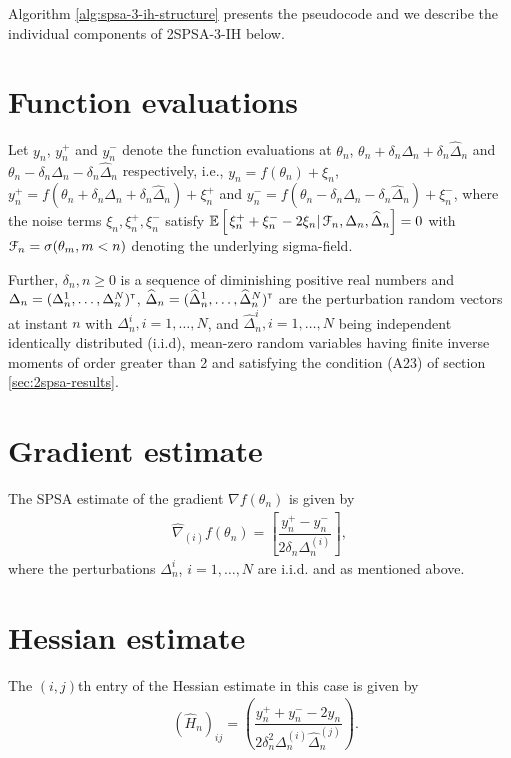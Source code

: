 Algorithm \ref{alg:spsa-3-ih-structure} presents the pseudocode and we describe the individual components of 2SPSA-3-IH below.
\section{Function evaluations}
Let $y_n$, $y_n^+$ and $y_n^-$ denote the function evaluations at $\theta_n$, $\theta_n+\delta_n \Delta_n+\delta_n \widehat \Delta_n$ and $\theta_n -\delta_n\Delta_n-\delta_n\widehat\Delta_n$ respectively, i.e., 
$y_n = f(\theta_n) + \xi_n$, $y_n^+ = f(\theta_n+\delta_n \Delta_n +\delta_n \widehat\Delta_n) + \xi_n^+$ and 
$y_n^- = f(\theta_n -\delta_n\Delta_n-\delta_n\widehat\Delta_n) + \xi_n^-$,
where the noise terms $\xi_n, \xi_n^+, \xi_n^-$ satisfy $\mathbb{E}\left[\left.\xi_n^+ + \xi_n^- - 2\xi_n \right| \mathcal{F}_n, \Delta_n, \widehat \Delta_n\right] = 0$ with $\mathcal{F}_n = \sigma(\theta_m,m <  n)$ denoting the underlying sigma-field.

Further, $\delta_n, n\geq 0$ is a sequence of diminishing positive real numbers and 
$\Delta_n = (\Delta_n^1,\ldots,\Delta_n^N)^\mathsf{\scriptscriptstyle T}$, $\widehat\Delta_n = (\widehat\Delta_n^1,\ldots,\widehat\Delta_n^N)^\mathsf{\scriptscriptstyle T}$ are the perturbation random vectors at instant $n$ with $\Delta_n^i,i=1,\ldots,N$, and $\widehat\Delta_n^i,i=1,\ldots,N$ being independent identically distributed (i.i.d), mean-zero random variables having finite inverse moments of order greater than 2 and satisfying the condition (A23) of section \ref{sec:2spsa-results}.  

\section{Gradient estimate}
The SPSA estimate of the gradient $\nabla f(\theta_n)$ is given by
\begin{align}
\label{eq:grad-spsa}
\widehat\nabla_{(i)} f(\theta_n) =  \left[ \dfrac{y_n^+ - y_n^-}{2\delta_n \Delta_n^{(i)}}\right],
\end{align}
where the perturbations $\Delta_n^i$, $i=1,\ldots,N$ are i.i.d. and as mentioned above.


\section{Hessian estimate}
The $(i,j)$th entry of the Hessian estimate in this case is given by
\begin{align}
\label{eq:2spsa-ber}
&\left(\widehat H_n\right)_{ij} =  \left(\dfrac{y_n^+ + y_n^- - 2 y_n}{2\delta_n^2 \Delta_n^{(i)} \widehat \Delta_n^{(j)}}\right).
\end{align}
